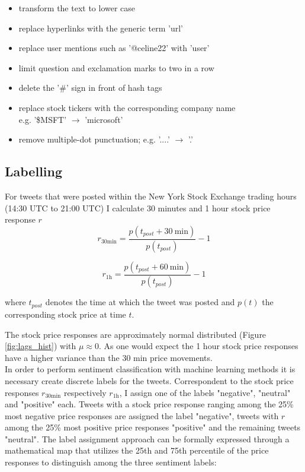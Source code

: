 \documentclass[a4paper,12pt]{article}%
\begin{document}
\begin{itemize}
\item transform the text to lower case
\item replace hyperlinks with the generic term 'url'
\item replace user mentions such as '@celine22' with 'user'
\item limit question and exclamation marks to two in a row
\item delete the '\#' sign in front of hash tags
\item replace stock tickers with the corresponding company name \\ e.g. '\$MSFT' $\longrightarrow$ 'microsoft'
\item remove multiple-dot punctuation; e.g. '....' $\longrightarrow$ '.'
\end{itemize}


\subsection{Labelling \label{labelling}}
For tweets that were posted within the New York Stock Exchange trading hours (14:30 UTC to 21:00 UTC) I calculate 30 minutes and 1 hour stock price response $r$
$$
r_{30\text{min}} = \frac{p(t_{post} + 30~\text{min})}{p(t_{post})} - 1
$$

$$
r_{1 \text{h}} = \frac{p(t_{post} + 60~\text{min})}{p(t_{post})} - 1
$$

where $t_{post}$ denotes the time at which the tweet was posted and $p(t)$ the corresponding stock price at time $t$.

The stock price responses are approximately normal distributed (Figure \ref{fig:lags_hist}) with $\mu \approx 0$. As one would expect the 1 hour stock price responses have a higher variance than the 30 min price movements.\\

In order to perform sentiment classification with machine learning methods it is necessary create discrete labels for the tweets. Correspondent to the stock price responses $r_{30\text{min}}$ respectively $r_{1 \text{h}}$, I assign one of the labels "negative", "neutral" and "positive" each. Tweets with a stock price response ranging among the 25\% most negative price responses are assigned the label "negative", tweets with $r$ among the 25\% most positive price responses "positive" and the remaining tweets "neutral". The label assignment approach can be formally expressed through a mathematical map that utilizes the 25th and 75th percentile of the price responses to distinguish among the three sentiment labels:
\end{document}
